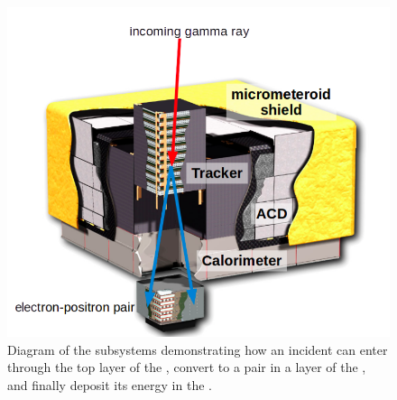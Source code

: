 \begin{figure}[ht!]
	\centering
	\includegraphics[width=1.0\columnwidth]{Figures/latGuts.png}
	\caption[Diagram of the three primary \lat{} subsytems.]{Diagram of the \lat{} subsystems demonstrating how an incident \gam{} can enter through the top layer of the \acd{}, convert to a \ee{} pair in a layer of the \tkr{}, and finally deposit its energy in the \calo{}.}
	\label{fig:latGuts}
\end{figure}
 
